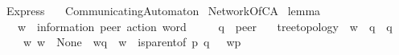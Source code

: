 %
\begin{isabellebody}%
%
%
\isadelimtheory
\isanewline
\isanewline
%
\endisadelimtheory
%
\isatagtheory
{}\isamarkupfalse%
\ Express\isanewline
\ \ \ CommunicatingAutomaton\isanewline
{}%
\endisatagtheory
{\isafoldtheory}%
%
\isadelimtheory
\isanewline
%
\endisadelimtheory
\isanewline
{}\isamarkupfalse%
\ NetworkOfCA\isanewline
{}%
\isadelimdocument
%
\endisadelimdocument
%
\isatagdocument
%
\isamarkuptrue%
%
\isamarkuptrue%
%
\endisatagdocument
{\isafolddocument}%
%
\isadelimdocument
%
\endisadelimdocument
{}\isamarkupfalse%
\ lemma{}{\isacharunderscore}{\kern0pt}{}\ {\isacharcolon}{\kern0pt}\ \isanewline
\ \ \ w\ {\isacharcolon}{\kern0pt}{\isacharcolon}{\kern0pt}\ {\isachardoublequoteopen}{\isacharparenleft}{\kern0pt}{\isacharprime}{\kern0pt}information{\isacharcomma}{\kern0pt}\ {\isacharprime}{\kern0pt}peer{\isacharparenright}{\kern0pt}\ action\ word{\isachardoublequoteclose}\isanewline
\ \ \ \ \ q\ {\isacharcolon}{\kern0pt}{\isacharcolon}{\kern0pt}\ {\isachardoublequoteopen}{\isacharprime}{\kern0pt}peer{\isachardoublequoteclose}\isanewline
\ \ \ {\isachardoublequoteopen}tree{\isacharunderscore}{\kern0pt}topology{\isachardoublequoteclose}\ \ {\isachardoublequoteopen}w\ {\isasymin}\ {\isasymL}\isactrlsup {\isacharasterisk}{\kern0pt}{\isacharparenleft}{\kern0pt}q{\isacharparenright}{\kern0pt}{\isachardoublequoteclose}\ \ {\isachardoublequoteopen}q\ {\isasymin}\ {\isasymP}{\isachardoublequoteclose}\isanewline
\ \ \ {\isachardoublequoteopen}{\isasymexists}\ w{\isacharprime}{\kern0pt}{\isachardot}{\kern0pt}\ {\isacharparenleft}{\kern0pt}w{\isacharprime}{\kern0pt}\ {\isasymin}\ {\isasymT}\isactrlbsub None\isactrlesub \ {\isasymand}\ w{\isacharprime}{\kern0pt}{\isasymdown}\isactrlsub q\ {\isacharequal}{\kern0pt}\ w\ {\isasymand}\ {\isacharparenleft}{\kern0pt}{\isacharparenleft}{\kern0pt}is{\isacharunderscore}{\kern0pt}parent{\isacharunderscore}{\kern0pt}of\ p\ q{\isacharparenright}{\kern0pt}\ {\isasymlongrightarrow}\ \ w{\isacharprime}{\kern0pt}{\isasymdown}\isactrlsub p\ {\isacharequal}{\kern0pt}\ {\isasymepsilon}{\isacharparenright}{\kern0pt}{\isacharparenright}{\kern0pt}{\isachardoublequoteclose}\isanewline
\ \ \ \ \isanewline
%
\isadelimproof

\end{isabellebody}
